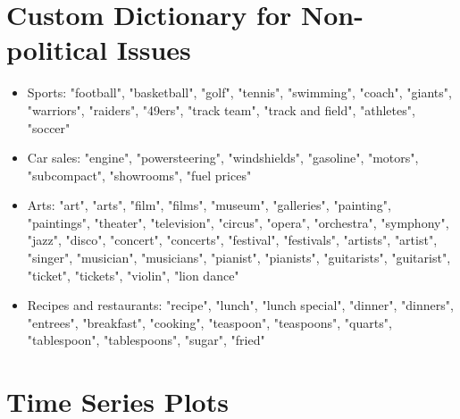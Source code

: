 \documentclass[12 pt]{article}
\begin{document}
\clearpage

\printbibliography



\clearpage
{} 

\begin{appendices}

\section{Custom Dictionary for Non-political Issues}
\label{appendix:dic}

\begin{itemize}
\item Sports: "football", "basketball", "golf", "tennis", "swimming", "coach", "giants", "warriors", "raiders", "49ers", "track team", "track and field", "athletes", "soccer"
\item Car sales: "engine", "powersteering", "windshields", "gasoline", "motors", "subcompact", "showrooms", "fuel prices" 
\item Arts: "art", "arts", "film", "films", "museum", "galleries", "painting", "paintings", "theater", "television", "circus", "opera", "orchestra", "symphony", "jazz", "disco", "concert", "concerts", "festival", "festivals", "artists", "artist", "singer", "musician", "musicians", "pianist", "pianists", "guitarists", "guitarist", "ticket", "tickets", "violin", "lion dance"
\item Recipes and restaurants: "recipe", "lunch", "lunch special", "dinner", "dinners", "entrees", "breakfast", "cooking", "teaspoon", "teaspoons", "quarts", "tablespoon", "tablespoons", "sugar", "fried"
\end{itemize}

\clearpage

\section{Time Series Plots}
\label{appendix:ts_plots}


\end{appendices}
\end{document}
